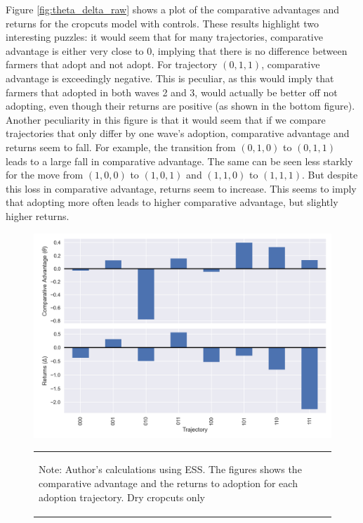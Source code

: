 \documentclass[11pt]{article}
\begin{document}



Figure \ref{fig:theta_delta_raw} shows a plot of the comparative advantages and returns for the cropcuts model with controls. These results highlight two interesting puzzles: it would seem that for many trajectories, comparative advantage is either very close to 0, implying that there is no difference between farmers that adopt and not adopt. For trajectory $(0,1,1)$, comparative advantage is exceedingly negative. This is peculiar, as this would imply that farmers that adopted in both waves 2 and 3, would actually be better off not adopting, even though their returns are positive (as shown in the bottom figure). Another peculiarity in this figure is that it would seem that if we compare trajectories that only differ by one wave's adoption, comparative advantage and returns seem to fall. For example, the transition from $(0,1,0)$ to $(0,1,1)$ leads to a large fall in comparative advantage. The same can be seen less starkly for the move from $(1,0,0)$ to $(1,0,1)$ and $(1,1,0)$ to $(1,1,1)$. But despite this loss in comparative advantage, returns seem to increase. This seems to imply that adopting more often leads to higher comparative advantage, but slightly higher returns. 

\begin{figure}
    \centering
    \caption{Comparative Advantage and Returns by Trajectory (Dry Cropcuts)}
    \includegraphics[scale=0.7]{results/figures/theta.png}\label{fig:theta_delta_raw}
        \vspace*{-2em}
    \begin{table}[H]
        \centering
        \begin{tabular}{p{}} 
            \begin{tablenotes}
                  \small
                  \item Note: Author's calculations using ESS. The figures shows the comparative advantage and the returns to adoption for each adoption trajectory. Dry cropcuts only
            \end{tablenotes}
        \end{tabular}
    \end{table}
\end{figure}
\end{document}
